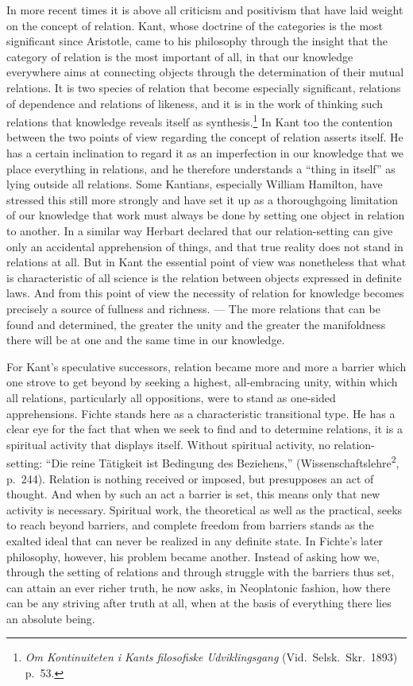 \documentclass[12pt]{article}
\newcommand{\opage}[1]{\marginnote{\footnotesize\textit{[#1]}}}
\begin{document}
In more recent times it is above all criticism and positivism that have laid
weight on the concept of relation. Kant, whose doctrine of the categories is
the most significant since Aristotle, came to his philosophy through the
insight that the category of relation is the most important of all, in that
our knowledge everywhere aims at connecting objects through the
determination of their mutual relations. It is two species of relation that
become especially significant, relations of dependence and relations of
likeness, and it is in the work of thinking such relations that knowledge
reveals itself as synthesis.\footnote{\textit{Om Kontinuiteten i Kants
filosofiske Udviklingsgang} (Vid.\ Selsk.\ Skr.\ 1893) p.~53.} In Kant too
the contention between the two points of view regarding the concept of
relation asserts itself. He has a certain inclination to regard it as an
imperfection in our knowledge that we place everything in relations, and he
therefore understands a ``thing in itself'' as lying outside all relations.
Some Kantians, especially William Hamilton, have stressed this still more
strongly and have set it up as a thoroughgoing limitation of our knowledge
that work must always be done by setting one object in relation to another.
In a similar way Herbart declared that our relation-setting can give only an
accidental apprehension of things, and that true reality does not stand in
relations at all. But in Kant the essential point of view was nonetheless
that what is characteristic of all science is the relation between objects
expressed in definite laws. And from this point of view the necessity of
relation for knowledge becomes precisely a source of fullness and richness.
--- The more relations that can be found \opage{11}and determined, the greater the
unity and the greater the manifoldness there will be at one and the same
time in our knowledge.

For Kant's speculative successors, relation became more and more a barrier
which one strove to get beyond by seeking a highest, all-embracing unity,
within which all relations, particularly all oppositions, were to stand as
one-sided apprehensions. Fichte stands here as a characteristic transitional
type. He has a clear eye for the fact that when we seek to find and to
determine relations, it is a spiritual activity that displays itself.
Without spiritual activity, no relation-setting: ``Die reine Tätigkeit ist
Bedingung des Beziehens,'' (Wissenschaftslehre\textsuperscript{2}, p.~244).
Relation is nothing received or imposed, but presupposes an act of thought.
And when by such an act a barrier is set, this means only that new activity
is necessary. Spiritual work, the theoretical as well as the practical,
seeks to reach beyond barriers, and complete freedom from barriers stands as
the exalted ideal that can never be realized in any definite state. In
Fichte's later philosophy, however, his problem became another. Instead of
asking how we, through the setting of relations and through struggle with
the barriers thus set, can attain an ever richer truth, he now asks, in
Neoplatonic fashion, how there can be any striving after truth at all, when
at the basis of everything there lies an absolute being.
\end{document}
